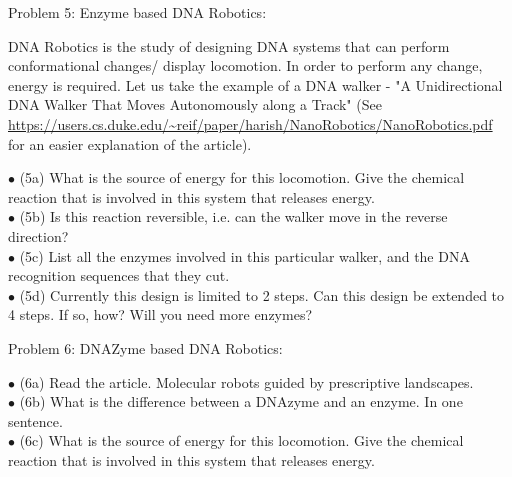 \documentclass{article}
\begin{document}
\newpage
\centerline{\sc Problem 5:  Enzyme based DNA Robotics:}
\vspace{0.2in}
DNA Robotics is the study of designing DNA systems that can perform conformational changes/ display locomotion. In order to perform any change, energy is required. Let us take the example of a DNA walker - 
"A Unidirectional DNA Walker That Moves Autonomously along a Track"
(See \url{ https://users.cs.duke.edu/~reif/paper/harish/NanoRobotics/NanoRobotics.pdf } for an easier explanation of the article).


$\bullet$ (5a) What is the source of energy for this locomotion. Give the chemical reaction that is involved in this system that releases energy.\\

$\bullet$ (5b) Is this reaction reversible, i.e. can the walker move in the reverse direction?\\


$\bullet$ (5c) List all the enzymes involved in this particular walker, and the DNA recognition sequences that they cut. \\

$\bullet$ (5d) Currently this design is limited to 2 steps. Can this design be extended to 4 steps. If so, how? Will you need more enzymes?\\





\newpage
\centerline{\sc Problem 6:    DNAZyme based DNA Robotics:}
\vspace{0.2in}


$\bullet$ (6a) Read the article. Molecular robots guided by prescriptive landscapes. \\

$\bullet$ (6b) What is the difference between a DNAzyme and an enzyme. In one sentence. \\

$\bullet$ (6c) What is the source of energy for this locomotion. Give the chemical reaction that is involved in this system that releases energy. \\
\end{document}
